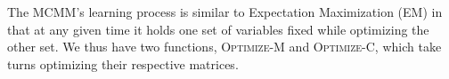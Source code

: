 



The MCMM's learning process is similar to Expectation Maximization
(EM) in that at any given time it holds one set of variables 
fixed while optimizing the other set. We thus have two functions, \textsc{Optimize-M}
and \textsc{Optimize-C}, which take turns optimizing their respective matrices.


